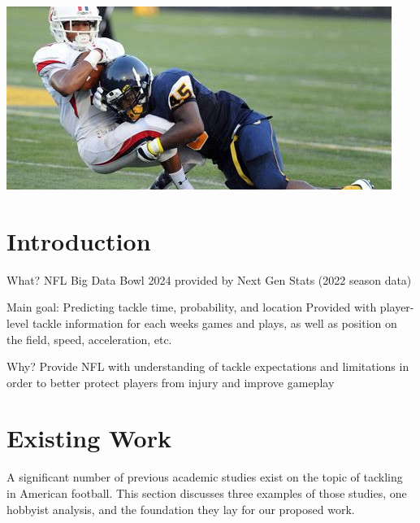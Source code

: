 \documentclass[sigconf, hyperref={colorlinks=true,linkcolor=blue,urlcolor=blue}]{acmart}
\begin{document}
\begin{teaserfigure}
  \includegraphics[width=\textwidth]{./th-4169371817}
  \label{fig:teaser}
\end{teaserfigure}


\maketitle

\section{Introduction}
What? NFL Big Data Bowl 2024 provided by Next Gen Stats (2022 season data)

Main goal: Predicting tackle time, probability, and location
Provided with player-level tackle information for each weeks games and
plays, as well as position on the field, speed, acceleration, etc.

Why?
Provide NFL with understanding of tackle expectations and limitations in order
to better protect players from injury and improve gameplay

\section{Existing Work}
A significant number of previous academic studies exist on the topic of
tackling in American football. This section discusses three examples of those
studies, one hobbyist analysis, and the foundation they lay for our proposed
work.
\end{document}
